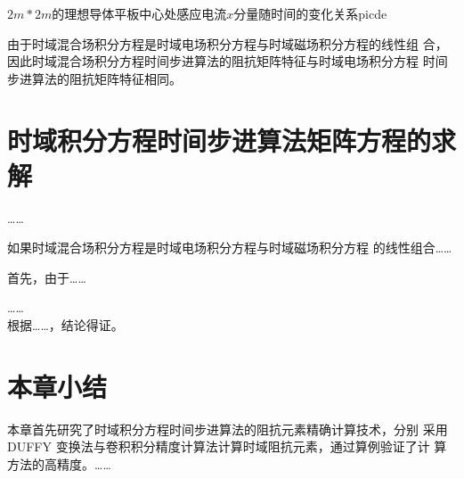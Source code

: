 \begin{pics}[h]{$2m*2m$的理想导体平板中心处感应电流$x$分量随时间的变化关系}{picde}
\end{pics}
%
由于时域混合场积分方程是时域电场积分方程与时域磁场积分方程的线性组
合，因此时域混合场积分方程时间步进算法的阻抗矩阵特征与时域电场积分方程
时间步进算法的阻抗矩阵特征相同。
\section{时域积分方程时间步进算法矩阵方程的求解}
……

\begin{dingli}
如果时域混合场积分方程是时域电场积分方程与时域磁场积分方程
的线性组合……
\end{dingli}
\begin{zhengming}
首先，由于……

……\\
根据……，结论得证。
\end{zhengming}
\section{本章小结}
本章首先研究了时域积分方程时间步进算法的阻抗元素精确计算技术，分别
采用DUFFY 变换法与卷积积分精度计算法计算时域阻抗元素，通过算例验证了计
算方法的高精度。……
